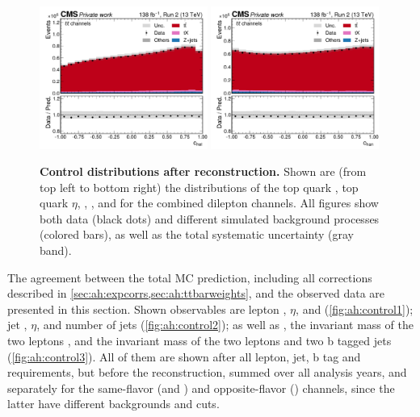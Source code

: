 \begin{figure}[!hp]
    \includegraphics[width=0.49\textwidth]{figures/ah/controlplots/Reco/chel__ll.pdf}
    \hfill
    \includegraphics[width=0.49\textwidth]{figures/ah/controlplots/Reco/chan__ll.pdf}
    \caption{
        \textbf{Control distributions after \ttbar reconstruction.} Shown are (from top left to bottom right) the distributions of the top quark \pt, top quark $\eta$, \mtt, \cost, \chel and \chan for the combined dilepton channels. All figures show both data (black dots) and different simulated background processes (colored bars), as well as the total systematic uncertainty (gray band). 
    }
    \label{fig:ah:controlttbar}
\end{figure}

The agreement between the total MC prediction, including all corrections described in \cref{sec:ah:expcorrs,sec:ah:ttbarweights}, and the observed data are presented in this section. Shown observables are lepton \pt, $\eta$, and \dphill (\cref{fig:ah:control1}); jet \pt, $\eta$, and number of jets (\cref{fig:ah:control2}); as well as \ptmiss, the invariant mass of the two leptons \mll, and the invariant mass of the two leptons and two b tagged jets \mbbll (\cref{fig:ah:control3}). All of them are shown after all lepton, jet, b tag and \ptmiss requirements, but before the \ttbar reconstruction, summed over all analysis years, and separately for the same-flavor (\ee and \mumu) and opposite-flavor (\emu) channels, since the latter have different backgrounds and cuts.

